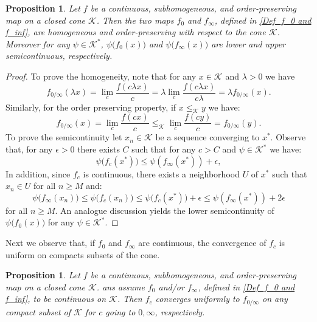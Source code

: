 \documentclass{article}
\newtheorem{proposition}[theorem]{Proposition}
\newcommand{\cone}{\mathcal{K}}
\newcommand{\cleq}{\leq_{\cone}}
\begin{document}
%
\begin{proposition}\label{Prop_limit_homogeneous_functions}
    Let $f$ be a continuous, subhomogeneous, and order-preserving map on a closed cone $\cone$. Then the two maps $f_{0}$ and $f_{\infty}$, defined in \eqref{Def_f_0 and f_inf}, are homogeneous and order-preserving with respect to the cone $\cone$. Moreover for any $\psi \in \cone^*$, $\psi\big(f_0(x)\big)$ and $\psi\big(f_\infty(x)\big)$ are lower and upper semicontinuous, respectively. 
\end{proposition}
\begin{proof}
    To prove the homogeneity, note that for any $x\in \cone$ and $\lambda>0$ we have
    \begin{equation}
       f_{0/\infty}(\lambda x)=\lim_{c}\frac{f(c\lambda x)}{c}=\lambda \lim_{c}\frac{f(c\lambda x)}{c\lambda}=\lambda f_{0/\infty}(x).
    \end{equation}
Similarly, for the order preserving property, if $x\cleq y$ we have:
    \begin{equation}
       f_{0/\infty}(x) =\lim_{c}\frac{f(c x)}{c}\cleq \lim_{c}\frac{f(c y)}{c}= f_{0/\infty}(y).
    \end{equation}
To prove the semicontinuity let $x_n\in \cone$ be a sequence converging to $x^*$. Observe that, for any $\epsilon>0$ there exists $C$ such that for any $c>C$ and $\psi\in \cone^*$ we have:
    \begin{equation}
        \psi\big(f_{c}(x^*)\big)\leq \psi(f_\infty(x^*))+\epsilon,
    \end{equation}
In addition, since $f_{c}$ is continuous, there exists a neighborhood $U$ of $x^*$ such that $x_n\in U$ for all $n\geq M$ and:
\begin{equation}
   \psi\big(f_{\infty}(x_n)\big)\leq \psi\big(f_{c}(x_n)\big)\leq \psi\big(f_{c}(x^*)\big)+\epsilon \leq \psi(f_\infty(x^*))+2\epsilon
\end{equation}
for all $n\geq M$. An analogue discussion yields the lower semicontinuity of $\psi\big(f_0(x)\big)$ for any $\psi\in\cone^*$.
\end{proof}
%
Next we observe that, if $f_0$ and $f_{\infty}$ are continuous, the convergence of $f_{c}$ is uniform on compacts subsets of the cone.
%
\begin{proposition}\label{Prop:uniform_convergence_limit_maps}
    Let $f$ be a continuous, subhomogeneous, and order-preserving map on a closed cone $\cone$. ans assume $f_0$ and/or $f_{\infty}$, defined in \eqref{Def_f_0 and f_inf}, to be continuous on $\cone$. Then $f_c$ converges uniformly to $f_{0/\infty}$ on any compact subset of $\cone$ for $c$ going to $0,\infty$, respectively. 
\end{proposition}
\end{document}
